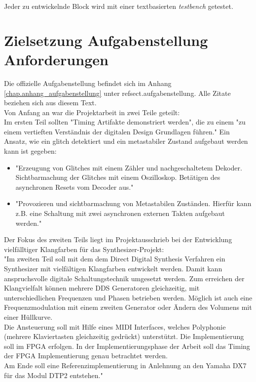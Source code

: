 Jeder zu entwickelnde Block wird mit einer textbasierten \textit{testbench} getestet. 

\section{Zielsetzung Aufgabenstellung Anforderungen}\label{sect.einleitung_ziele}
Die offizielle Aufgabenstellung befindet sich im Anhang \ref{chap.anhang_aufgabenstellung} unter ref{sect.aufgabenstellung}. Alle Zitate beziehen sich aus diesem Text.\\


Von Anfang an war die Projektarbeit in zwei Teile geteilt:\\Im ersten Teil sollten "Timing Artifakte demonstriert werden", die zu einem "zu einem vertieften Verständnis der digitalen Design Grundlagen führen." 
Ein Ansatz, wie ein glitch detektiert und ein metastabiler Zustand aufgebaut werden kann ist gegeben:\\
\begin{itemize}
	\item "Erzeugung von Glitches mit einem Zähler und nachgeschaltetem Dekoder. Sichtbarmachung der Glitches mit einem Oszilloskop. Betätigen des asynchronen Resets vom Decoder aus." 

	\item "Provozieren und sichtbarmachung von Metastabilen Zuständen. Hierfür kann z.B. eine Schaltung mit zwei asynchronen externen Takten aufgebaut werden." 
\end{itemize}  

Der Fokus des zweiten Teils liegt im Projektausschrieb bei der Entwicklung vielfälltiger Klangfarben für das Synthesizer-Projekt: \\
"Im zweiten Teil soll mit dem dem Direct Digital Synthesis Verfahren ein Synthesizer mit vielfältigen Klangfarben entwickelt werden. Damit kann anspruchsvolle digitale Schaltungstechnik umgesetzt werden. Zum erreichen der Klangvielfalt können mehrere DDS Generatoren gleichzeitig, mit unterschiedlichen Frequenzen und Phasen betrieben werden. Möglich ist auch eine Frequenzmodulation mit einem zweiten Generator oder Ändern des Volumens mit einer Hüllkurve. \\
Die Ansteuerung soll mit Hilfe eines MIDI Interfaces, welches Polyphonie (mehrere Klaviertasten gleichzeitig gedrückt) unterstützt. Die Implementierung soll im FPGA erfolgen. In der Implementierungsphase der Arbeit soll das Timing der FPGA Implementierung genau betrachtet werden. \\
Am Ende soll eine Referenzimplementierung in Anlehnung an den Yamaha DX7 für das Modul DTP2 entstehen."

